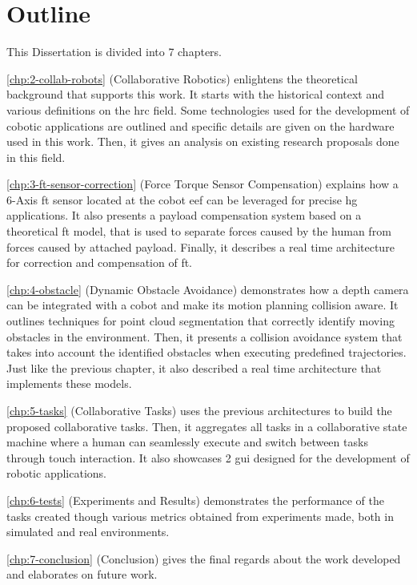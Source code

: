 \section{Outline}

\par This Dissertation is divided into 7 chapters.
\par \autoref{chp:2-collab-robots} (Collaborative Robotics) enlightens the theoretical background that supports this work. It starts with the historical context and various definitions on the \ac{hrc} field. Some technologies used for the development of cobotic applications are outlined and specific details are given on the hardware used in this work. Then, it gives an analysis on existing research proposals done in this field.

\par \autoref{chp:3-ft-sensor-correction} (Force Torque Sensor Compensation) explains how a 6-Axis \ac{ft} sensor located at the cobot \ac{eef} can be leveraged for precise \ac{hg} applications. It also presents a payload compensation system based on a theoretical \ac{ft} model, that is used to separate forces caused by the human from forces caused by attached payload. Finally, it describes a real time architecture for correction and compensation of \ac{ft}.

\par \autoref{chp:4-obstacle} (Dynamic Obstacle Avoidance) demonstrates how a depth camera can be integrated with a cobot and make its motion planning collision aware. It outlines techniques for point cloud segmentation that correctly identify moving obstacles in the environment. Then, it presents a collision avoidance system that takes into account the identified obstacles when executing predefined trajectories. Just like the previous chapter, it also described a real time architecture that implements these models.

\par \autoref{chp:5-tasks} (Collaborative Tasks) uses the previous architectures to build the proposed collaborative tasks. Then, it aggregates all tasks in a collaborative state machine where a human can seamlessly execute and switch between tasks through touch interaction. It also showcases 2 \ac{gui} designed for the development of robotic applications.

\par \autoref{chp:6-tests} (Experiments and Results) demonstrates the performance of the tasks created though various metrics obtained from experiments made, both in simulated and real environments.

\par \autoref{chp:7-conclusion} (Conclusion) gives the final regards about the work developed and elaborates on future work.
